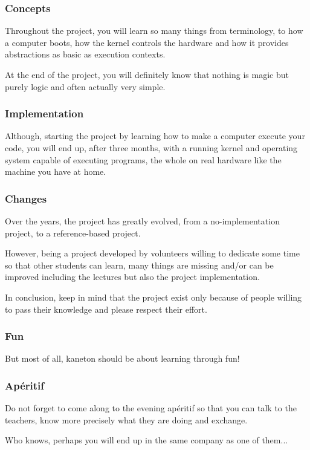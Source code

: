 \begin{frame}
  \frametitle{Concepts}

  Throughout the project, you will learn so many things from terminology,
  to how a computer boots, how the kernel controls the hardware and how it
  provides abstractions as basic as execution contexts.

  \-

  At the end of the project, you will definitely know that nothing is magic
  but purely logic and often actually very simple.
\end{frame}


\begin{frame}
  \frametitle{Implementation}

  Although, starting the project by learning how to make a computer execute
  your code, you will end up, after three months, with a running kernel
  and operating system capable of executing programs, the whole on real
  hardware like the machine you have at home.
\end{frame}


\begin{frame}
  \frametitle{Changes}

  Over the years, the project has greatly evolved, from a no-implementation
  project, to a reference-based project.

  \-

  However, being a project developed by volunteers willing to dedicate some
  time so that other students can learn, many things are missing and/or
  can be improved including the lectures but also the project implementation.

  \-

  In conclusion, keep in mind that the project exist only because of people
  willing to pass their knowledge and please respect their effort.
\end{frame}


\begin{frame}
  \frametitle{Fun}

  But most of all, kaneton should be about learning through fun!
\end{frame}


\begin{frame}
  \frametitle{Ap\'eritif}

  Do not forget to come along to the evening ap\'eritif so that you can
  talk to the teachers, know more precisely what they are doing and
  exchange.

  \-

  Who knows, perhaps you will end up in the same company as one of them...
\end{frame}


